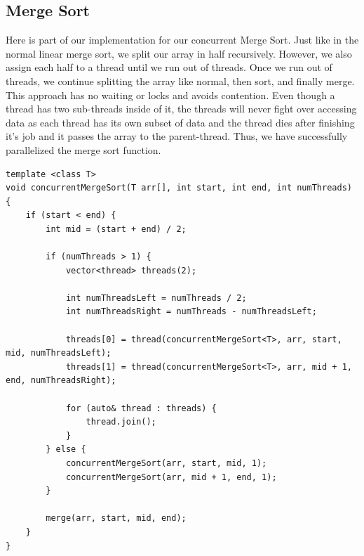 \documentclass[conference]{IEEEtran}
\begin{document}
\subsection{Merge Sort}
Here is part of our implementation for our concurrent Merge Sort. Just like in the normal linear merge sort, we split our array in half recursively. However, we also assign each half to a thread until we run out of threads. Once we run out of threads, we continue splitting the array like normal, then sort, and finally merge. This approach has no waiting or locks and avoids contention. Even though a thread has two sub-threads inside of it, the threads will never fight over accessing data as each thread has its own subset of data and the thread dies after finishing it's job and it passes the array to the parent-thread. Thus, we have successfully parallelized the merge sort function.
\\
\begin{lstlisting}
template <class T>
void concurrentMergeSort(T arr[], int start, int end, int numThreads) {
    if (start < end) {
        int mid = (start + end) / 2;
        
        if (numThreads > 1) {
            vector<thread> threads(2);

            int numThreadsLeft = numThreads / 2;
            int numThreadsRight = numThreads - numThreadsLeft;

            threads[0] = thread(concurrentMergeSort<T>, arr, start, mid, numThreadsLeft);
            threads[1] = thread(concurrentMergeSort<T>, arr, mid + 1, end, numThreadsRight);
            
            for (auto& thread : threads) {
                thread.join();
            }
        } else {
            concurrentMergeSort(arr, start, mid, 1);
            concurrentMergeSort(arr, mid + 1, end, 1);
        }

        merge(arr, start, mid, end);
    }
}
\end{lstlisting}
\end{document}

